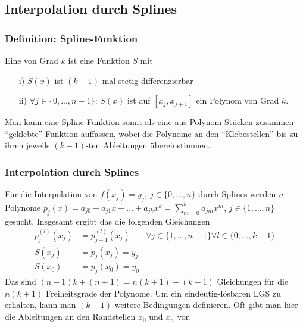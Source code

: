 \subsection{Interpolation durch Splines}
\makeSectionDividerPage
%
\begin{frame}\frametitle{Definition: Spline-Funktion}
Eine  von Grad $k$ ist eine Funktion $S$ mit
\begin{itemize}
\item[i)] $S(x)$ ist $(k-1)$-mal stetig differenzierbar
\item[ii)] $\forall j \in \{0,...,n-1\}$: $S(x)$ ist auf $[x_j,x_{j+1}]$ ein Polynom von Grad $k$.
\end{itemize}
\vfill \pause
Man kann eine Spline-Funktion somit als eine aus Polynom-Stücken zusammen ``geklebte'' Funktion auffassen, wobei die Polynome an den ``Klebestellen'' bis zu ihren jeweils $(k-1)$-ten Ableitungen übereinstimmen.

\end{frame}
%
\begin{frame}\frametitle{Interpolation durch Splines}	
Für die Interpolation von $f(x_j)=y_j, \ j \in \{0,...,n\}$ durch Splines werden $n$ Polynome $p_j(x)=a_{j0}+a_{j1}x+...+a_{jk}x^k=\sum_{m=0}^k a_{jm}x^m$, $j \in \{1,...,n\}$ gesucht. Insgesamt ergibt das die folgenden Gleichungen
\begin{align*}
p_j^{(l)}(x_j)&=p_{j+1}^{(l)}(x_j) &\forall j\in \{1,...,n-1\} \forall l \in \{0,...,k-1\}\\
S(x_j)&=p_j(x_j)=y_j\\
S(x_0)&=p_j(x_0)=y_0
\end{align*}
Das sind $(n-1)k+(n+1)=n(k+1)-(k-1)$ Gleichungen für die $n(k+1)$ Freiheitsgrade der Polynome. Um ein eindeutig-lösbaren LGS zu erhalten, kann man $(k-1)$ weitere Bedingungen definieren. Oft gibt man hier die Ableitungen an den Randstellen $x_0$ und $x_n$ vor.
\end{frame}
%
